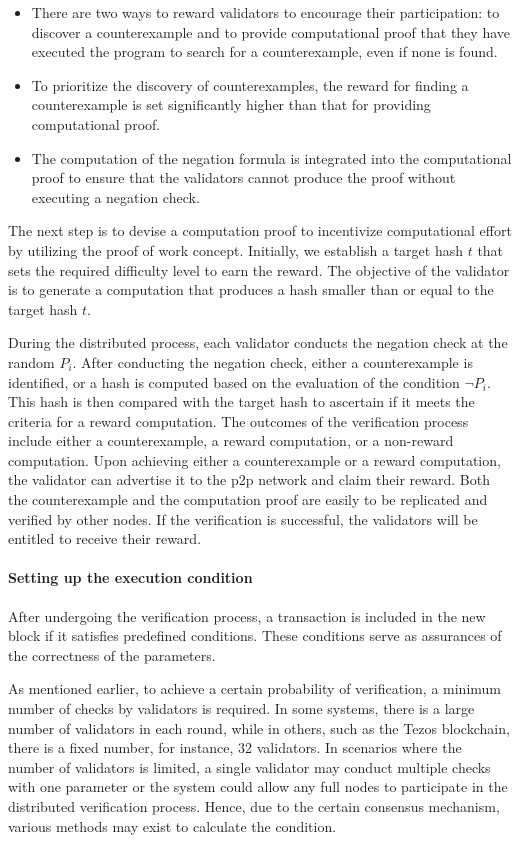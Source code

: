 \documentclass[runningheads]{llncs}
\begin{document}
\begin{itemize}
\item There are two ways to reward validators to encourage their participation: to discover a counterexample and to provide computational proof that they have executed the program to search for a counterexample, even if none is found.
\item To prioritize the discovery of counterexamples, the reward for finding a counterexample is set significantly higher than that for providing computational proof.
\item The computation of the negation formula is integrated into the computational proof to ensure that the validators cannot produce the proof without executing a negation check.
\end{itemize}

The next step is to devise a computation proof to incentivize computational effort by utilizing the proof of work concept. Initially, we establish a target hash $t$ that sets the required difficulty level to earn the reward. The objective of the validator is to generate a computation that produces a hash smaller than or equal to the target hash $t$. 

During the distributed process, each validator conducts the negation check at the random $P_i$. After conducting the negation check, either a counterexample is identified, or a hash is computed based on the evaluation of the condition $\neg P_{i}$. This hash is then compared with the target hash to ascertain if it meets the criteria for a reward computation. The outcomes of the verification process include either a counterexample, a reward computation, or a non-reward computation. Upon achieving either a counterexample or a reward computation, the validator can advertise it to the p2p network and claim their reward. Both the counterexample and the computation proof are easily to be replicated and verified by other nodes. If the verification is successful, the validators will be entitled to receive their reward.

\paragraph{Setting up the execution condition}  After undergoing the verification process, a transaction is included in the new block if it satisfies predefined conditions. These conditions serve as assurances of the correctness of the parameters. 

As mentioned earlier, to achieve a certain probability of verification, a minimum number of checks by validators is required. In some systems, there is a large number of validators in each round, while in others, such as the Tezos blockchain, there is a fixed number, for instance, 32 validators. In scenarios where the number of validators is limited, a single validator may conduct multiple checks with one parameter or the system could allow any full nodes to participate in the distributed verification process. Hence, due to the certain consensus mechanism, various methods may exist to calculate the condition.
\end{document}
